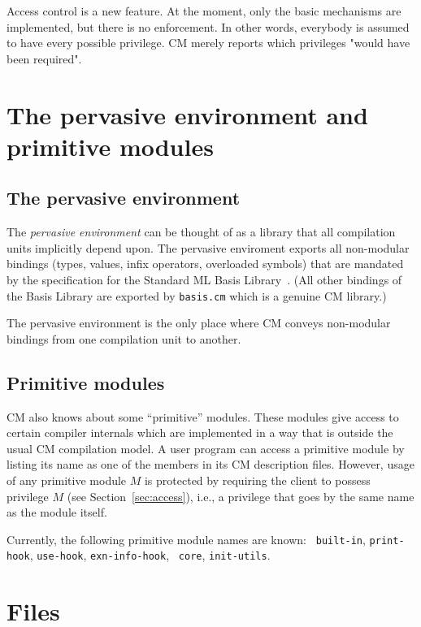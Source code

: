 \documentclass{article}
\begin{document}
Access control is a new feature. At the moment, only the basic
mechanisms are implemented, but there is no enforcement.  In other
words, everybody is assumed to have every possible privilege.  CM
merely reports which privileges "would have been required".

\section{The pervasive environment and primitive modules}

\subsection{The pervasive environment}

The {\em pervasive environment} can be thought of as a library that
all compilation units implicitly depend upon.  The pervasive
enviroment exports all non-modular bindings (types, values, infix
operators, overloaded symbols) that are mandated by the specification
for the Standard ML Basis Library~\cite{reppy99:basis}.  (All other
bindings of the Basis Library are exported by {\tt basis.cm} which is
a genuine CM library.)

The pervasive environment is the only place where CM conveys
non-modular bindings from one compilation unit to another.

\subsection{Primitive modules}

CM also knows about some ``primitive'' modules.  These modules give
access to certain compiler internals which are implemented in a way
that is outside the usual CM compilation model.  A user program can
access a primitive module by listing its name as one of the members in
its CM description files.  However, usage of any primitive module $M$
is protected by requiring the client to possess  privilege $M$
(see Section~\ref{sec:access}), i.e., a privilege that goes by the
same name as the module itself.

Currently, the following primitive module names are known: {\tt
built-in}, {\tt print-hook}, {\tt use-hook}, {\tt exn-info-hook}, {\tt
core}, {\tt init-utils}.

\section{Files}
\end{document}
